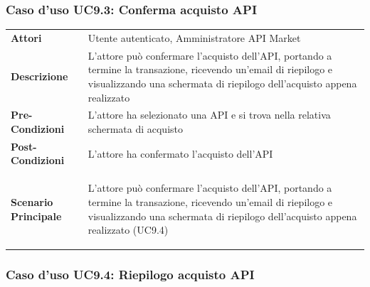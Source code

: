 \subsubsection{Caso d'uso UC9.3: Conferma acquisto API}
\label{UC9_3}

\begin{minipage}{\linewidth}
	\begin{tabular}{ l | p{11cm}}
		\hline
		\rowcolor{Gray}
		\multicolumn{2}{c}{UC9.3 - Conferma acquisto API} \\
		\hline
		\textbf{Attori} & Utente autenticato, Amministratore API Market \\
		\textbf{Descrizione} & L'attore può confermare l'acquisto dell'API, portando a termine la transazione, ricevendo un'email di riepilogo e visualizzando una schermata di riepilogo dell'acquisto appena realizzato \\
		\textbf{Pre-Condizioni} & L'attore ha selezionato una API e si trova nella relativa schermata di acquisto \\
		\textbf{Post-Condizioni} & L'attore ha confermato l'acquisto dell'API \\
		\textbf{Scenario Principale} & 
		\begin{enumerate*}[label=(\arabic*.),itemjoin={\newline}]
			\item L'attore può confermare l'acquisto dell'API, portando a termine la transazione, ricevendo un'email di riepilogo e visualizzando una schermata di riepilogo dell'acquisto appena realizzato (UC9.4)
		\end{enumerate*}\\
	\end{tabular}
\end{minipage}

\subsubsection{Caso d'uso UC9.4: Riepilogo acquisto API}
\label{UC9_4}

